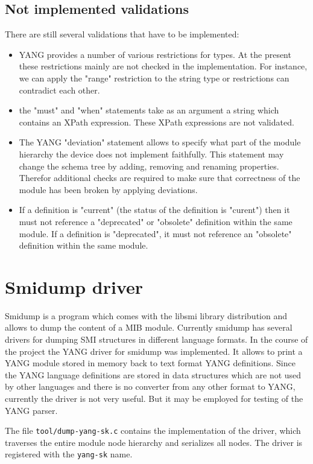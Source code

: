 \documentclass[conference]{IEEEtran}
\begin{document}
\subsection{Not implemented validations}\label{notimpl}
There are still several validations that have to be implemented:
\begin{itemize}
\item YANG provides a number of various restrictions for types. At the present these restrictions mainly are not checked in the implementation. 
For instance, we can apply the "range" restriction to the string type or restrictions can contradict each other.
\item the "must" and "when" statements take as an argument a string which contains an XPath expression. 
 These XPath expressions are not validated.
\item The YANG "deviation" statement allows to specify what part of the module hierarchy the device does not implement faithfully.
 This statement may change the schema tree by adding, removing and renaming properties. Therefor additional checks are required 
 to make sure that correctness of the module has been broken by applying deviations.
\item If a definition is "current" (the status of the definition is "curent") then it must not reference a "deprecated" or "obsolete" definition within the same module. 
If a definition is "deprecated", it must not reference an "obsolete" definition within the same module.  
\end{itemize}

\section{Smidump driver}
Smidump is a program which comes with the libsmi library distribution and allows to dump the content of a MIB module.
Currently smidump has several drivers for dumping SMI structures in different language formats.
In the course of the project the YANG driver for smidump was implemented. 
It allows to print a YANG module stored in memory back to text format YANG definitions. 
Since the YANG language definitions are stored in data structures which are not used by other languages and there is no converter from any other format to YANG,
currently the driver is not very useful. But it may be employed for testing of the YANG parser.

The file \texttt{tool/dump-yang-sk.c} contains the implementation of the driver, which traverses the entire module node hierarchy and serializes all nodes. The driver is registered with the \texttt{yang-sk} name.
\end{document}
